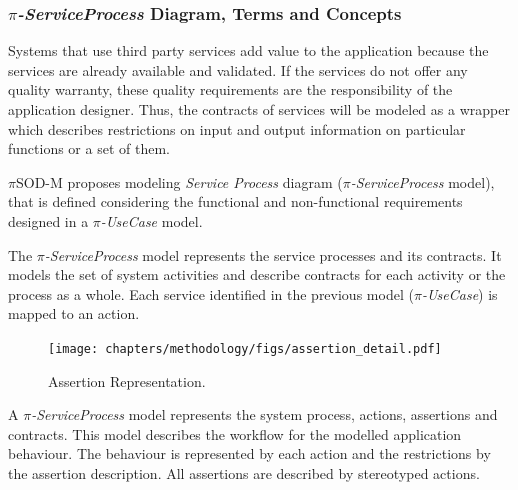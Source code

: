  \subsubsection{\textit{$\pi$-ServiceProcess} Diagram, Terms and Concepts} 


Systems that use third party services add value to the application because the
services are already available and validated. If the services do not offer any
quality warranty, these quality requirements are the responsibility of the
application designer. Thus, the contracts of services will be modeled as a
wrapper which describes restrictions on input and output information on
particular functions or a set of them. 


$\pi$SOD-M proposes modeling \textit{Service Process} diagram
(\textit{$\pi$-ServiceProcess} model), that is defined considering the
functional and non-functional requirements designed in a
\textit{$\pi$-UseCase} model.

The \textit{$\pi$-ServiceProcess} model represents the service processes and its
contracts. It models the set of system activities and describe contracts for
each activity or the process as a whole. Each service identified in the previous
model (\textit{$\pi$-UseCase}) is mapped to an action. 


 

 
 
%  
  \begin{figure}[ht!]
\centering
\texttt{[image: chapters/methodology/figs/assertion\_detail.pdf]}
\caption{Assertion Representation.}
\label{fig:assertion_representation}
\end{figure}
 
 
 A \textit{$\pi$-ServiceProcess} model represents the system process,
 actions, assertions and contracts. This model describes the workflow for the modelled application
 behaviour. The behaviour is represented by each action and the restrictions by
 the assertion description. All assertions are described by stereotyped actions.
 
